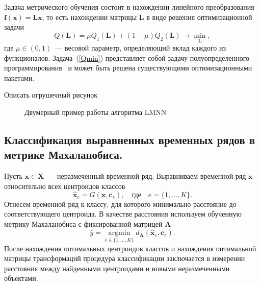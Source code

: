 Задача метрического обучения состоит в нахождении линейного преобразования $\mathbf{f}(\mathbf{x}) = \mathbf{Lx}$, то есть нахождении матрицы $\mathbf{L}$ в виде решения оптимизационной задачи
\begin{equation}
\label{Qmin}
Q(\mathbf{L}) = \mu Q_1(\mathbf{L}) + (1 - \mu) Q_2(\mathbf{L}) \rightarrow \min_{\mathbf{L}},
\end{equation}
где $\mu \in (0, 1)$~--- весовой параметр, определяющий вклад каждого из функционалов.
Задача~(\ref{Qmin}) представляет собой задачу полуопределенного программирования~\cite{vandenberghe1996semidefinite} и может быть решена существующими оптимизационными пакетами.

{\color{red} Описать игрушечный рисунок}

\begin{figure}[ht]
	\caption{Двумерный пример работы алгоритма LMNN}
\end{figure}

\subsection{Классификация выравненных временных рядов в метрике Махаланобиса.}

Пусть $\mathbf{x} \in \mathbf{X}$~--- неразмеченный временной ряд. Выравниваем временной ряд $\mathbf{x}$ относительно всех центроидов классов
\[
\mathbf{\hat{x}}_e = G(\mathbf{x}, \mathbf{c}_e), \quad \text{где} \quad e = \{1, \dots, K\}.
\]
Отнесем временной ряд к классу, для которого минимально расстояние до соответствующего центроида. В качестве расстояния используем обученную метрику Махаланобиса с фиксированной матрицей $\mathbf{A}$
\[
\hat{y} = \mathop{\text{argmin}}\limits_{e \in \{1, \dots, K\}}d_\mathbf{A}(\mathbf{\hat{x}}_e, \mathbf{c}_e).
\]
После нахождения оптимальных центроидов классов и нахождения оптимальной матрицы трансформаций процедура классификации заключается в измерении расстояния между найденными центроидами и новыми неразмеченными объектами.

